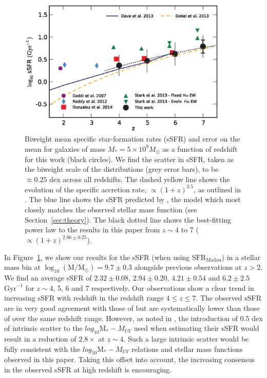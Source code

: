 \begin{figure}
\centering
\includegraphics[width=100mm]{plots/fig13.eps}
\caption{Biweight mean specific star-formation rates (sSFR) and error on the mean for galaxies of mass $M_{*} = 5 \times 10^9 M_{\odot}$ as a function of redshift for this work (black circles). We find the scatter in sSFR, taken as the biweight scale of the distributions (grey error bars), to be $\approx 0.25$ dex across all redshifts. The dashed yellow line shows the evolution of the specific accretion rate, $\propto (1 + z)^{2.5}$, as outlined in \citet{Dekel:2013id}. The blue line shows the sSFR predicted by \citet{Dave:2013bf}, the model which most closely matches the observed stellar mass function (see Section~\ref{sec:theory}). The black dotted line shows the best-fitting power law to the results in this paper from $z \sim 4$ to 7 ($\propto (1 + z)^{2.06 \pm 0.25}$).}
\label{fig:ssfr_evolution}
\end{figure}

In Figure~\ref{fig:ssfr_evolution}, we show our results for the sSFR (when using $\text{SFR}_{\text{Madau}}$) in a stellar mass bin at $\log_{10}(\text{M} / \text{M}_{\odot}) = 9.7 \pm 0.3$ alongside previous observations at $z > 2$. We find an average sSFR of $2.32\pm0.08$, $2.94\pm0.20$, $4.21\pm0.54$ and $6.2\pm2.5$ $\text{Gyr}^{-1}$ for $z\sim 4$, 5, 6 and 7 respectively. Our observations show a clear trend in increasing sSFR with redshift in the redshift range $4 \leq z \leq 7$. The observed sSFR are in very good agreement with those of \citet{Gonzalez:2014do} but are systematically lower than those of \citet{Stark:2013ix} over the same redshift range. However, as noted in \citet{Stark:2013ix}, the introduction of 0.5 dex of intrinsic scatter to the $log_{10}\text{M}_{*}-M_{UV}$ used when estimating their sSFR would result in a reduction of $2.8\times$ at $z\sim4$. Such a large intrinsic scatter would be fully consistent with the $log_{10}\text{M}_{*}-M_{UV}$ relations and stellar mass functions observed in this paper. Taking this offset into account, the increasing consensus in the observed sSFR at high redshift is encouraging.
 
